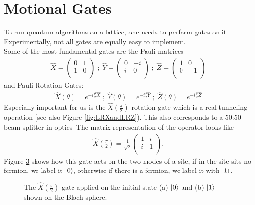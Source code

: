 \section{Motional Gates}
To run quantum algorithms on a lattice, one needs to perform gates on it. Experimentally, not all gates are equally easy to implement. \\
Some of the most fundamental gates are the Pauli matrices
\begin{align}
    \hat{X}= \begin{pmatrix}
        0 & 1 \\
        1 & 0 \\
    \end{pmatrix}
    \;;\; 
    \hat{Y} = \begin{pmatrix}
        0 & -i \\
        i & 0 \\
    \end{pmatrix}
    \;;\;
    \hat{Z} = \begin{pmatrix}
        1 & 0 \\
        0 & -1 \\
    \end{pmatrix}
\end{align}
and Pauli-Rotation Gates:
\begin{align}
    \widehat{X}(\theta)= e^{-i\frac{\theta}{2}\hat{X}} \;;\;
    \widehat{Y}(\theta)= e^{-i\frac{\theta}{2}\hat{Y}} \;;\;
    \widehat{Z}(\theta)= e^{-i\frac{\theta}{2}\hat{Z}} 
\end{align}
Especially important for us is the $\widehat{X}(\frac{\pi}{2})$ rotation gate which is a real tunneling operation (see also Figure \ref{fig:LRXandLRZ}). This also corresponds to a 50:50 beam splitter in optics. The matrix representation of the operator looks like
\begin{align}
    \widehat{X}(\frac{\pi}{2}) = \frac{1}{\sqrt{2}}\begin{pmatrix}
        1 & i \\
        i & 1 \\
    \end{pmatrix}.
    \label{RXgate}
\end{align}
Figure \ref{fig:bloch_rx} shows how this gate acts on the two modes of a site, if in the site sits no fermion, we label it $\ket{0}$, otherwise if there is a fermion, we label it with $\ket{1}$. 

\begin{figure}[t]
  \centering
  \begin{subfigure}[t]{0.48\linewidth}
    \subcaption{} \label{fig:rx0}
  \end{subfigure}
  \hfill
  \begin{subfigure}[t]{0.48\linewidth}
    \subcaption{} \label{fig:rx1}
  \end{subfigure}

  \caption[Visual effect of the $\widehat{X}(\tfrac\pi2)$ on initial states]{The $\widehat{X}(\tfrac\pi2)$‐gate applied on the initial state (a) $\ket{0}$ and (b) $\ket{1}$ shown on the Bloch-sphere.}
  \label{fig:bloch_rx}
\end{figure}

